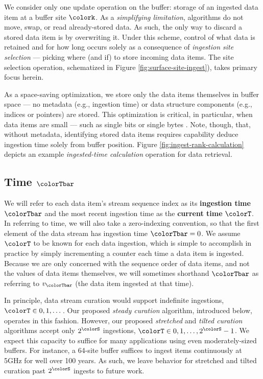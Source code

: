 We consider only one update operation on the buffer: storage of an ingested data item at a buffer site $\colork$.
As a \textit{simplifying limitation}, algorithms do not move, swap, or read already-stored data.
As such, the only way to discard a stored data item is by overwriting it.
Under this scheme, control of what data is retained and for how long occurs solely as a consequence of \textit{ingestion site selection} --- picking where (and if) to store incoming data items.
The site selection operation, schematized in Figure \ref{fig:surface-site-ingest}), takes primary focus herein.

As a space-saving optimization, we store only the data items themselves in buffer space --- no metadata (e.g., ingestion time) or data structure components (e.g., indices or pointers) are stored.
This optimization is critical, in particular, when data items are small --- such as single bits or single bytes \citep{moreno2022hereditary}.
Note, though, that, without metadata, identifying stored data items requires capability deduce ingestion time solely from buffer position.
Figure \ref{fig:ingest-rank-calculation} depicts an example \textit{ingested-time calculation} operation for data retrieval.

\subsection{Time $\colorTbar$}
\label{sec:notation-time}

We will refer to each data item's stream sequence index as its \textbf{ingestion time} $\colorTbar$ and the most recent ingestion time as the \textbf{current time} $\colorT$.
In referring to time, we will also take a zero-indexing convention, so that the first element of the data stream has ingestion time $\colorTbar=0$.
We assume $\colorT$ to be known for each data ingestion, which is simple to accomplish in practice by simply incrementing a counter each time a data item is ingested.
Because we are only concerned with the sequence order of data items, and not the values of data items themselves, we will sometimes shorthand $\colorTbar$ as referring to $v_{\colorTbar}$ (the data item ingested at that time).

In principle, data stream curation would support indefinite ingestions, $\colorT \in 0, 1, \ldots \,$.
Our proposed \textit{steady curation} algorithm, introduced below, operates in this fashion.
However, our proposed \textit{stretched} and \textit{tilted curation} algorithms accept only $2^{\colorS}$ ingestions, $\colorT \in 0, 1, \ldots, 2^{\colorS} - 1$.
We expect this capacity to suffice for many applications using even moderately-sized buffers.
For instance, a 64-site buffer suffices to ingest items continuously at 5GHz for well over 100 years.
As such, we leave behavior for stretched and tilted curation past $2^{\colorS}$ ingests to future work.

